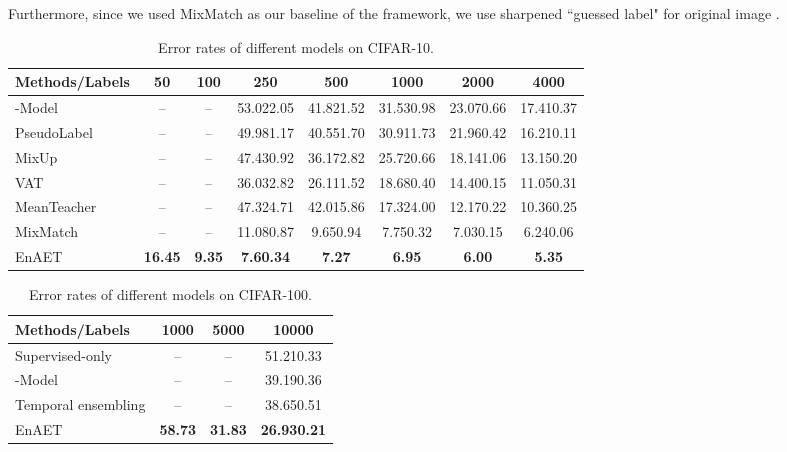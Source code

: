 \documentclass[journal]{IEEEtran}
\begin{document}
Furthermore, since we used MixMatch as our baseline of the framework, we use sharpened ``guessed label"  for original image .
\begin{table*}[!htp]
\centering
\caption{Error rates of different models on CIFAR-10.}
\label{tab:cifar10}
\begin{tabular}{lccccccc}
\toprule
Methods/Labels & 50 & 100 & 250 & 500 & 1000 & 2000 & 4000 \\ \midrule
{-}Model \cite{laine2016temporal,sajjadi2016regularization} & -- & -- & 53.022.05 & 41.821.52 & 31.530.98 & 23.070.66 & 17.410.37 \\
PseudoLabel \cite{lee2013pseudo} & -- & -- & 49.981.17 & 40.551.70 & 30.911.73 & 21.960.42 & 16.210.11 \\
MixUp \cite{zhang2017mixup} & -- & -- & 47.430.92 & 36.172.82 & 25.720.66 & 18.141.06 & 13.150.20 \\
VAT \cite{miyato2018virtual} & -- & -- & 36.032.82 & 26.111.52 & 18.680.40 & 14.400.15 & 11.050.31 \\
 MeanTeacher \cite{tarvainen2017mean} & -- & -- & 47.324.71 & 42.015.86 & 17.324.00 & 12.170.22 & 10.360.25 \\
MixMatch \cite{berthelot2019mixmatch} & -- & -- & 11.080.87 & 9.650.94 & 7.750.32 & 7.030.15 & 6.240.06 \\
\midrule
EnAET & \textbf{16.45} & \textbf{9.35} & \textbf{7.60.34} & \textbf{7.27} & \textbf{6.95} & \textbf{6.00} & \textbf{5.35} \\ \bottomrule
\end{tabular}\end{table*}

\begin{table}[]
\centering
\caption{Error rates of different models on CIFAR-100.}
\label{tab:cifar100}
\begin{tabular}{lccc}
\toprule
Methods/Labels & 1000 & 5000 & 10000 \\ \midrule
Supervised-only & -- & -- & 51.210.33 \\
-Model \cite{sajjadi2016regularization} & -- & -- & 39.190.36 \\
 Temporal ensembling \cite{laine2016temporal} & -- & -- & 38.650.51 \\\midrule
EnAET & \textbf{58.73} & \textbf{31.83} & \textbf{26.930.21} \\ \bottomrule
\end{tabular}
\end{table}
\end{document}
